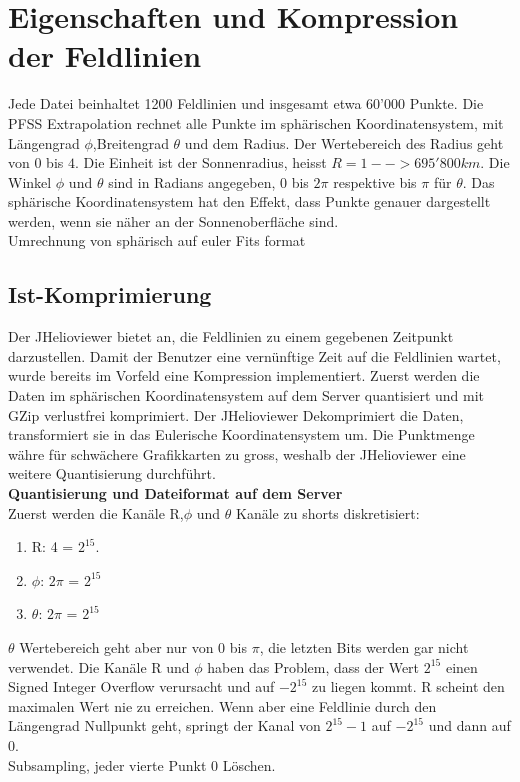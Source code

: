\section{Eigenschaften und Kompression der Feldlinien}
Jede Datei beinhaltet 1200 Feldlinien und insgesamt etwa 60'000 Punkte. Die PFSS Extrapolation rechnet alle Punkte im sphärischen Koordinatensystem, mit Längengrad $\phi$,Breitengrad $\theta$ und dem Radius. Der Wertebereich des Radius geht von $0$ bis $4$. Die Einheit ist der Sonnenradius, heisst $R = 1 --> 695'800 km$. Die Winkel $\phi$ und $\theta$ sind in Radians angegeben, $0$ bis $2\pi$ respektive bis $\pi$ für $\theta$. Das sphärische Koordinatensystem hat den Effekt, dass Punkte genauer dargestellt werden, wenn sie näher an der Sonnenoberfläche sind.\\
[\baselineskip]
Umrechnung von sphärisch auf euler
Fits format \cite{website:fits}

\subsection{Ist-Komprimierung} \label{konzept:ist-komprimierung}
Der JHelioviewer bietet an, die Feldlinien zu einem gegebenen Zeitpunkt darzustellen. Damit der Benutzer eine vernünftige Zeit auf die Feldlinien wartet, wurde bereits im Vorfeld eine Kompression implementiert. Zuerst werden die Daten im sphärischen Koordinatensystem auf dem Server quantisiert und mit GZip verlustfrei komprimiert. Der JHelioviewer Dekomprimiert die Daten, transformiert sie in das Eulerische Koordinatensystem um. Die Punktmenge währe für schwächere Grafikkarten zu gross, weshalb der JHelioviewer eine weitere Quantisierung durchführt.\\
[\baselineskip]
\textbf{Quantisierung und Dateiformat auf dem Server}\\
Zuerst werden die Kanäle R,$\phi$ und $\theta$ Kanäle zu shorts diskretisiert:
\begin{enumerate}
 \item R: 4 = $2^{15}$. 
 \item $\phi$: $2\pi$ = $2^{15}$
 \item $\theta$: $2\pi$ = $2^{15}$
\end{enumerate}
$\theta$ Wertebereich geht aber nur von 0 bis $\pi$, die letzten Bits werden gar nicht verwendet. Die Kanäle R und $\phi$ haben das Problem, dass der Wert $2^{15}$ einen Signed Integer Overflow verursacht und auf $-2^{15}$ zu liegen kommt. R scheint den maximalen Wert nie zu erreichen. Wenn aber eine Feldlinie durch den Längengrad Nullpunkt geht, springt der Kanal von  $2^{15}-1$ auf $-2^{15}$ und dann auf 0.\\
[\baselineskip]
Subsampling, jeder vierte Punkt 
0 Löschen.

